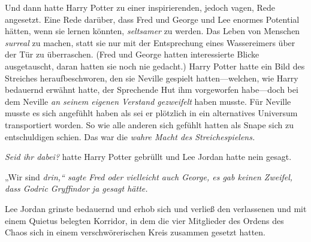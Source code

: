Und dann hatte Harry Potter zu einer inspirierenden, jedoch vagen, Rede angesetzt. Eine Rede darüber, dass Fred und George und Lee enormes Potential hätten, wenn sie lernen könnten, \emph{seltsamer} zu werden. Das Leben von Menschen \emph{surreal} zu machen, statt sie nur mit der Entsprechung eines Wassereimers über der Tür zu überraschen. (Fred und George hatten interessierte Blicke ausgetauscht, daran hatten sie noch nie gedacht.) Harry Potter hatte ein Bild des Streiches heraufbeschworen, den sie Neville gespielt hatten—welchen, wie Harry bedauernd erwähnt hatte, der Sprechende Hut ihm vorgeworfen habe—doch bei dem Neville \emph{an seinem eigenen Verstand gezweifelt} haben musste. Für Neville musste es sich angefühlt haben als sei er plötzlich in ein alternatives Universum transportiert worden. So wie alle anderen sich gefühlt hatten als Snape sich zu entschuldigen schien. Das war die \emph{wahre Macht des Streichespielens.}

\emph{Seid ihr dabei?} hatte Harry Potter gebrüllt und Lee Jordan hatte nein gesagt.

„Wir sind \emph{drin,“ sagte Fred oder vielleicht auch George, es gab keinen Zweifel, dass Godric Gryffindor ja gesagt hätte.}

Lee Jordan grinste bedauernd und erhob sich und verließ den verlassenen und mit einem Quietus belegten Korridor, in dem die vier Mitglieder des Ordens des Chaos sich in einem verschwörerischen Kreis zusammen gesetzt hatten.

